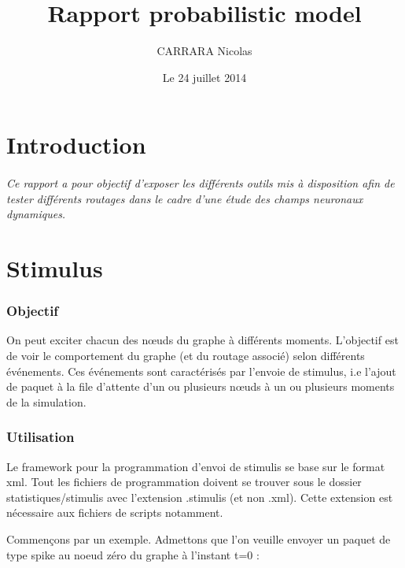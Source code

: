 \documentclass{report}
\begin{document}
\title{Rapport probabilistic model}
\author{CARRARA Nicolas}
\date{Le 24 juillet 2014}
\tableofcontents



\part{Introduction}
\paragraph{
Ce rapport a pour objectif d'exposer les différents outils mis à disposition afin de tester différents routages dans le cadre d'une étude des champs neuronaux dynamiques.
}


\part{Stimulus}

\section{Objectif}

On peut exciter chacun des nœuds du graphe à différents moments. L'objectif est de voir le comportement du graphe (et du routage associé) selon différents événements. Ces événements sont caractérisés par l'envoie de stimulus, i.e l'ajout de paquet à la file d'attente d'un ou plusieurs nœuds à un ou plusieurs moments de la simulation.

\section{Utilisation}

Le framework pour la programmation d'envoi de stimulis se base sur le format xml. Tout les fichiers de programmation doivent se trouver sous le dossier statistiques/stimulis avec l'extension .stimulis (et non .xml). Cette extension est nécessaire aux fichiers de scripts notamment.

Commençons par un exemple. Admettons que l'on veuille envoyer un paquet de type spike au noeud zéro du graphe à l'instant t=0 :
\\
\inputminted[linenos=true,frame=single,label=asend.stimulis]{xml}{/home/nikolai/Work/Loria2014/dnfsim2/statistiques/stimulis/a_send.stimulis}
\end{document}
